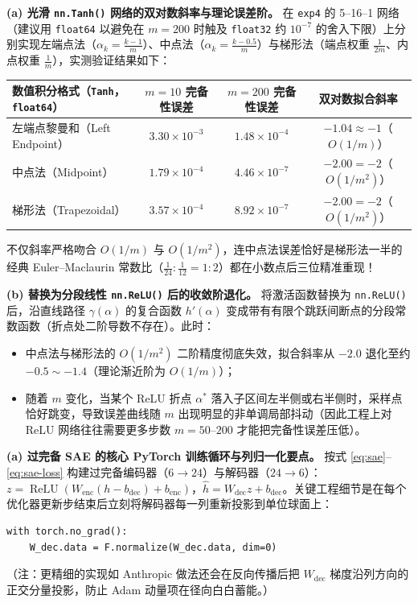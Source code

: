 
\textbf{(a) 光滑 \texttt{nn.Tanh()} 网络的双对数斜率与理论误差阶。}
在 \texttt{exp4} 的 5--16--1 网络（建议用 \texttt{float64} 以避免在 $m = 200$ 时触及 \texttt{float32} 约 $10^{-7}$ 的舍入下限）上分别实现左端点法（$\alpha_k = \frac{k-1}{m}$）、中点法（$\alpha_k = \frac{k-0.5}{m}$）与梯形法（端点权重 $\frac{1}{2m}$、内点权重 $\frac{1}{m}$），实测验证结果如下：
\begin{center}
\footnotesize
\begin{tabular}{lccc}
\toprule
数值积分格式（\texttt{Tanh}，\texttt{float64}） & $m = 10$ 完备性误差 & $m = 200$ 完备性误差 & 双对数拟合斜率 \\
\midrule
左端点黎曼和（Left Endpoint） & $3.30 \times 10^{-3}$ & $1.48 \times 10^{-4}$ & $\mathbf{-1.04} \approx -1$（$O(1/m)$） \\
中点法（Midpoint） & $1.79 \times 10^{-4}$ & $4.46 \times 10^{-7}$ & $\mathbf{-2.00} = -2$（$O(1/m^2)$） \\
梯形法（Trapezoidal） & $3.57 \times 10^{-4}$ & $8.92 \times 10^{-7}$ & $\mathbf{-2.00} = -2$（$O(1/m^2)$） \\
\bottomrule
\end{tabular}
\end{center}
不仅斜率严格吻合 $O(1/m)$ 与 $O(1/m^2)$，连中点法误差恰好是梯形法一半的经典 Euler--Maclaurin 常数比（$\frac{1}{24} : \frac{1}{12} = 1 : 2$）都在小数点后三位精准重现！

\textbf{(b) 替换为分段线性 \texttt{nn.ReLU()} 后的收敛阶退化。}
将激活函数替换为 \texttt{nn.ReLU()} 后，沿直线路径 $\gamma(\alpha)$ 的复合函数 $h'(\alpha)$ 变成带有有限个跳跃间断点的分段常数函数（折点处二阶导数不存在）。此时：
\begin{itemize}
  \item 中点法与梯形法的 $O(1/m^2)$ 二阶精度彻底失效，拟合斜率从 $-2.0$ 退化至约 $-0.5 \sim -1.4$（理论渐近阶为 $O(1/m)$）；
  \item 随着 $m$ 变化，当某个 ReLU 折点 $\alpha^*$ 落入子区间左半侧或右半侧时，采样点恰好跳变，导致误差曲线随 $m$ 出现明显的非单调局部抖动（因此工程上对 ReLU 网络往往需要更多步数 $m = 50\text{--}200$ 才能把完备性误差压低）。
\end{itemize}


\textbf{(a) 过完备 SAE 的核心 PyTorch 训练循环与列归一化要点。}
按式 \eqref{eq:sae}--\eqref{eq:sae-loss} 构建过完备编码器（$6 \to 24$）与解码器（$24 \to 6$）：$z = \operatorname{ReLU}(W_{\text{enc}}(h - b_{\text{dec}}) + b_{\text{enc}})$，$\hat{h} = W_{\text{dec}} z + b_{\text{dec}}$。关键工程细节是在每个优化器更新步结束后立刻将解码器每一列重新投影到单位球面上：
\begin{lstlisting}
with torch.no_grad():
    W_dec.data = F.normalize(W_dec.data, dim=0)
\end{lstlisting}
（注：更精细的实现如 Anthropic 做法还会在反向传播后把 $W_{\text{dec}}$ 梯度沿列方向的正交分量投影，防止 Adam 动量项在径向白白蓄能。）

